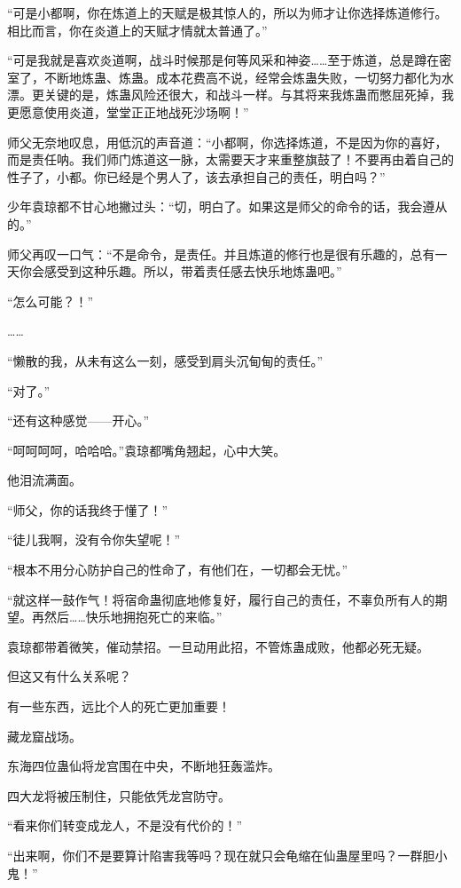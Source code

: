 \begin{this_body}
“可是小都啊，你在炼道上的天赋是极其惊人的，所以为师才让你选择炼道修行。相比而言，你在炎道上的天赋才情就太普通了。”

“可是我就是喜欢炎道啊，战斗时候那是何等风采和神姿……至于炼道，总是蹲在密室了，不断地炼蛊、炼蛊。成本花费高不说，经常会炼蛊失败，一切努力都化为水漂。更关键的是，炼蛊风险还很大，和战斗一样。与其将来我炼蛊而憋屈死掉，我更愿意使用炎道，堂堂正正地战死沙场啊！”

师父无奈地叹息，用低沉的声音道：“小都啊，你选择炼道，不是因为你的喜好，而是责任呐。我们师门炼道这一脉，太需要天才来重整旗鼓了！不要再由着自己的性子了，小都。你已经是个男人了，该去承担自己的责任，明白吗？”

少年袁琼都不甘心地撇过头：“切，明白了。如果这是师父的命令的话，我会遵从的。”

师父再叹一口气：“不是命令，是责任。并且炼道的修行也是很有乐趣的，总有一天你会感受到这种乐趣。所以，带着责任感去快乐地炼蛊吧。”

“怎么可能？！”

……

“懒散的我，从未有这么一刻，感受到肩头沉甸甸的责任。”

“对了。”

“还有这种感觉——开心。”

“呵呵呵呵，哈哈哈。”袁琼都嘴角翘起，心中大笑。

他泪流满面。

“师父，你的话我终于懂了！”

“徒儿我啊，没有令你失望呢！”

“根本不用分心防护自己的性命了，有他们在，一切都会无忧。”

“就这样一鼓作气！将宿命蛊彻底地修复好，履行自己的责任，不辜负所有人的期望。再然后……快乐地拥抱死亡的来临。”

袁琼都带着微笑，催动禁招。一旦动用此招，不管炼蛊成败，他都必死无疑。

但这又有什么关系呢？

有一些东西，远比个人的死亡更加重要！

藏龙窟战场。

东海四位蛊仙将龙宫围在中央，不断地狂轰滥炸。

四大龙将被压制住，只能依凭龙宫防守。

“看来你们转变成龙人，不是没有代价的！”

“出来啊，你们不是要算计陷害我等吗？现在就只会龟缩在仙蛊屋里吗？一群胆小鬼！”


\end{this_body}
